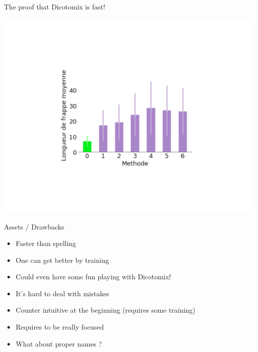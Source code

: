 \documentclass[graphics]{beamer}
\begin{document}
\begin{frame}{The proof that Dicotomix is fast!}
	\begin{center}
		\includegraphics[scale=0.35]{graphe_comparatif.pdf}
	\end{center}
\end{frame}

\begin{frame}{Assets / Drawbacks}
	\begin{tcolorbox}[colback=green!5,colframe=green!40!black,title=Assets]
		\begin{itemize}
			\item Faster than spelling
			\item One can get better by training
			\item Could even have some fun playing with Dicotomix!
		\end{itemize}
	\end{tcolorbox}
	\pause
	\begin{tcolorbox}[colback=red!5,colframe=red!40!black,title=Drawbacks]
		\begin{itemize}
			\item It's hard to deal with mistakes
			\item Counter intuitive at the beginning (requires some training)
			\item Requires to be really focused
			\item What about proper names ?
		\end{itemize}
	\end{tcolorbox}
\end{frame}
\end{document}
